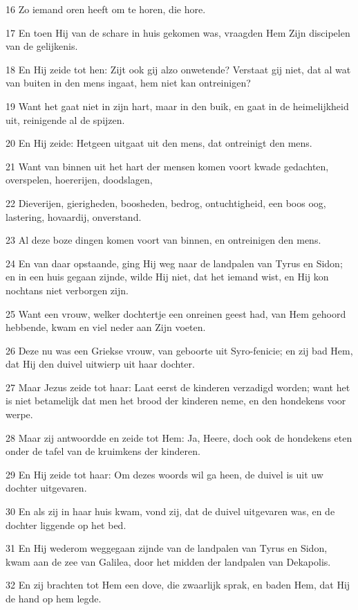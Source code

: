 \par 16 Zo iemand oren heeft om te horen, die hore.
\par 17 En toen Hij van de schare in huis gekomen was, vraagden Hem Zijn discipelen van de gelijkenis.
\par 18 En Hij zeide tot hen: Zijt ook gij alzo onwetende? Verstaat gij niet, dat al wat van buiten in den mens ingaat, hem niet kan ontreinigen?
\par 19 Want het gaat niet in zijn hart, maar in den buik, en gaat in de heimelijkheid uit, reinigende al de spijzen.
\par 20 En Hij zeide: Hetgeen uitgaat uit den mens, dat ontreinigt den mens.
\par 21 Want van binnen uit het hart der mensen komen voort kwade gedachten, overspelen, hoererijen, doodslagen,
\par 22 Dieverijen, gierigheden, boosheden, bedrog, ontuchtigheid, een boos oog, lastering, hovaardij, onverstand.
\par 23 Al deze boze dingen komen voort van binnen, en ontreinigen den mens.
\par 24 En van daar opstaande, ging Hij weg naar de landpalen van Tyrus en Sidon; en in een huis gegaan zijnde, wilde Hij niet, dat het iemand wist, en Hij kon nochtans niet verborgen zijn.
\par 25 Want een vrouw, welker dochtertje een onreinen geest had, van Hem gehoord hebbende, kwam en viel neder aan Zijn voeten.
\par 26 Deze nu was een Griekse vrouw, van geboorte uit Syro-fenicie; en zij bad Hem, dat Hij den duivel uitwierp uit haar dochter.
\par 27 Maar Jezus zeide tot haar: Laat eerst de kinderen verzadigd worden; want het is niet betamelijk dat men het brood der kinderen neme, en den hondekens voor werpe.
\par 28 Maar zij antwoordde en zeide tot Hem: Ja, Heere, doch ook de hondekens eten onder de tafel van de kruimkens der kinderen.
\par 29 En Hij zeide tot haar: Om dezes woords wil ga heen, de duivel is uit uw dochter uitgevaren.
\par 30 En als zij in haar huis kwam, vond zij, dat de duivel uitgevaren was, en de dochter liggende op het bed.
\par 31 En Hij wederom weggegaan zijnde van de landpalen van Tyrus en Sidon, kwam aan de zee van Galilea, door het midden der landpalen van Dekapolis.
\par 32 En zij brachten tot Hem een dove, die zwaarlijk sprak, en baden Hem, dat Hij de hand op hem legde.
